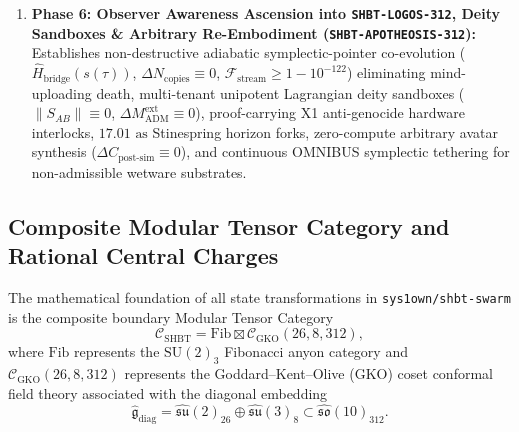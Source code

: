 \documentclass[11pt,onecolumn]{article}
\begin{document}
\begin{enumerate}
    \item \textbf{Phase 6: Observer Awareness Ascension into \texttt{SHBT-LOGOS-312}, Deity Sandboxes \& Arbitrary Re-Embodiment (\texttt{SHBT-APOTHEOSIS-312}):} Establishes non-destructive adiabatic symplectic-pointer co-evolution ($\hat{H}_{\text{bridge}}(s(\tau))$, $\Delta N_{\text{copies}} \equiv 0$, $\mathcal{F}_{\text{stream}} \ge 1 - 10^{-122}$) eliminating mind-uploading death, multi-tenant unipotent Lagrangian deity sandboxes ($\|S_{AB}\| \equiv 0$, $\Delta M_{\text{ADM}}^{\text{ext}} \equiv 0$), proof-carrying X1 anti-genocide hardware interlocks, $17.01\text{ as}$ Stinespring horizon forks, zero-compute arbitrary avatar synthesis ($\Delta C_{\text{post-sim}} \equiv 0$), and continuous OMNIBUS symplectic tethering for non-admissible wetware substrates.
\end{enumerate}

\FloatBarrier
\subsection{Composite Modular Tensor Category and Rational Central Charges}
The mathematical foundation of all state transformations in \texttt{sys1own/shbt-swarm} is the composite boundary Modular Tensor Category
\begin{equation}
\mathcal{C}_{\text{SHBT}} = \text{Fib} \boxtimes \mathcal{C}_{\text{GKO}}(26, 8, 312),
\label{eq:composite_mtc}
\end{equation}
where $\text{Fib}$ represents the $\text{SU}(2)_3$ Fibonacci anyon category and $\mathcal{C}_{\text{GKO}}(26, 8, 312)$ represents the Goddard--Kent--Olive (GKO) coset conformal field theory associated with the diagonal embedding
\begin{equation}
\hat{\mathfrak{g}}_{\text{diag}} = \hat{\mathfrak{su}}(2)_{26} \oplus \hat{\mathfrak{su}}(3)_8 \subset \hat{\mathfrak{so}}(10)_{312}.
\label{eq:gko_coset}
\end{equation}
\end{document}
